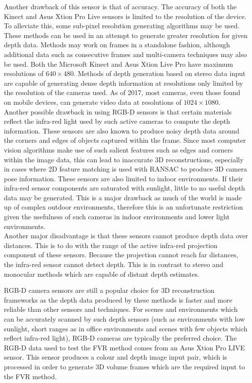 Another drawback of this sensor is that of accuracy. The accuracy of both the Kinect and Asus Xtion Pro Live sensors is limited to the resolution of the device. To alleviate this, some sub-pixel resolution generating algorithms may be used. These methods can be used in an attempt to generate greater resolution for given depth data. Methods may work on frames in a standalone fashion, although additional data such as consecutive frames and multi-camera techniques may also be used. Both the Microsoft Kinect and Asus Xtion Live Pro have maximum resolutions of $640 \times 480$. Methods of depth generation based on stereo data input are capable of generating dense depth information at resolutions only limited by the resolution of the cameras used. As of 2017, most cameras, even those found on mobile devices, can generate video data at resolutions of $1024 \times 1080$. \\

Another possible drawback in using RGB-D sensors is that certain materials reflect the infra-red light used by such active cameras to compute the depth information. These sensors are also known to produce noisy depth data around the corners and edges of objects captured within the frame. Since most computer vision algorithms make use of such salient features such as edges and corners within the image data, this can lead to inaccurate 3D reconstructions, especially in cases where 2D feature matching is used with RANSAC to produce 3D camera pose information. These sensors are also limited to indoor environments. If their infra-red sensor components are saturated with sunlight, little to no useful depth data may be generated. This is a major drawback as much of the world is made up of complex outdoor environments, therefore this is an unfortunate restriction given the usefulness of such cameras in indoor environments and lower light environments. \\

Another major disadvantage is that these sensors cannot produce depth data over distances. This is to do with the range of the active infra-red projection component of these sensors. Because the projection cannot reach far distances, the infra-red sensor cannot detect depth. This is in contrast to stereo and monocular methods which are capable of distant depth estimates.  

RGB-D camera sensors are still a popular choice for 3D reconstruction frameworks as the depth data produced by these methods is faster and more reliable than other sensors and techniques. For scenes and environments which can be accurately scanned by such depth sensors (such as environments with low sunlight, short ranges as in office environments and scenes with few objects which reflect infra-red light), RGB-D cameras are typically the preferred choice. The RGB-D data used to test the FVR method comes from an Asus Xtion Pro LIVE sensor. This sensor produces a colour and depth image input pair, which is processed in order to generate 3D volume frames which are the required input to the FVR method. \\

